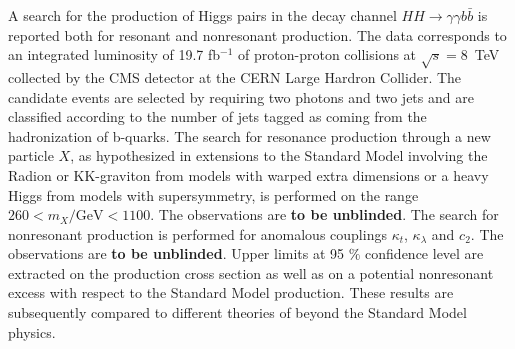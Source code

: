 A search for the production of Higgs pairs in the decay channel
$HH \rightarrow \gamma\gamma b\bar{b}$ is reported both for
resonant and nonresonant production. The data corresponds to an integrated
luminosity of 19.7 fb$^{-1}$ of proton-proton collisions at $\sqrt{s}=8$~TeV collected by the
CMS detector at the CERN Large Hardron Collider.
The candidate events are selected by requiring two photons and two jets and are classified
according to the number of jets tagged as coming from the hadronization of b-quarks.
The search for resonance production through a new particle $X$, as hypothesized in extensions
to the Standard Model involving the Radion or KK-graviton from models with warped extra dimensions
or a heavy Higgs from models with supersymmetry,
is performed on the range $260 < m_X/\text{GeV} < 1100$.
The observations are {\bf to be unblinded}.
The search for nonresonant production is performed for anomalous couplings
$\kappa_{t}$, $\kappa_{\lambda}$ and $c_2$.
The observations are {\bf to be unblinded}.
Upper limits at 95 $\%$ confidence level are extracted on the production cross section
as well as on a potential nonresonant excess with respect to the Standard Model production.
These results are subsequently compared to different theories of beyond the Standard Model physics.
